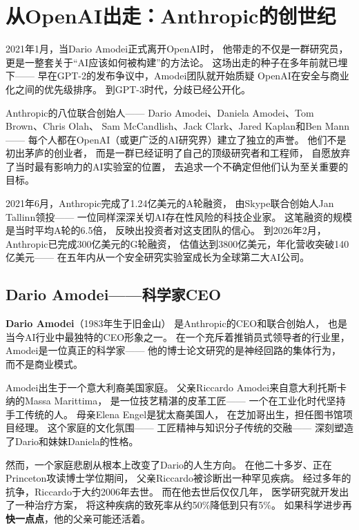 \section{从OpenAI出走：Anthropic的创世纪}
\label{sec:anthropic-exodus}

2021年1月，当Dario Amodei正式离开OpenAI时，
他带走的不仅是一群研究员，
更是一整套关于``AI应该如何被构建''的方法论。
这场出走的种子在多年前就已埋下——
早在GPT-2的发布争议中，Amodei团队就开始质疑
OpenAI在安全与商业化之间的优先级排序。
到GPT-3时代，分歧已经公开化。

Anthropic的八位联合创始人——
Dario Amodei、Daniela Amodei、Tom Brown、Chris Olah、
Sam McCandlish、Jack Clark、Jared Kaplan和Ben Mann——
每个人都在OpenAI（或更广泛的AI研究界）建立了独立的声誉。
他们不是初出茅庐的创业者，
而是一群已经证明了自己的顶级研究者和工程师，
自愿放弃了当时最有影响力的AI实验室的位置，
去追求一个不确定但他们认为至关重要的目标。

2021年6月，Anthropic完成了1.24亿美元的A轮融资，
由Skype联合创始人Jan Tallinn领投——
一位同样深深关切AI存在性风险的科技企业家。
这笔融资的规模是当时平均A轮的6.5倍，
反映出投资者对这支团队的信心。
到2026年2月，Anthropic已完成300亿美元的G轮融资，
估值达到3800亿美元，年化营收突破140亿美元——
在五年内从一个安全研究实验室成长为全球第二大AI公司。

\subsection{Dario Amodei——科学家CEO}
\label{subsec:dario}

\textbf{Dario Amodei}（1983年生于旧金山）
是Anthropic的CEO和联合创始人，
也是当今AI行业中最独特的CEO形象之一。
在一个充斥着推销员式领导者的行业里，
Amodei是一位真正的科学家——
他的博士论文研究的是神经回路的集体行为，
而不是商业模式。

Amodei出生于一个意大利裔美国家庭。
父亲Riccardo Amodei来自意大利托斯卡纳的Massa Marittima，
是一位技艺精湛的皮革工匠——
一个在工业化时代坚持手工传统的人。
母亲Elena Engel是犹太裔美国人，
在芝加哥出生，担任图书馆项目经理。
这个家庭的文化氛围——
工匠精神与知识分子传统的交融——
深刻塑造了Dario和妹妹Daniela的性格。

然而，一个家庭悲剧从根本上改变了Dario的人生方向。
在他二十多岁、正在Princeton攻读博士学位期间，
父亲Riccardo被诊断出一种罕见疾病。
经过多年的抗争，Riccardo于大约2006年去世。
而在他去世后仅仅几年，
医学研究就开发出了一种治疗方案，
将这种疾病的致死率从约50\%降低到只有5\%。
如果科学进步再\textbf{快一点点}，他的父亲可能还活着。

